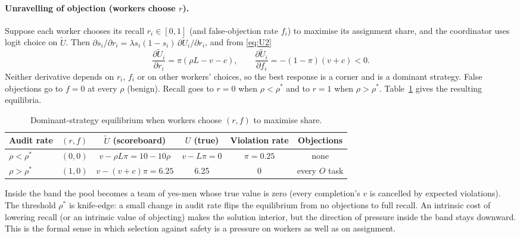 \documentclass[11pt,letterpaper]{article}
\newcommand{\rhostar}{\rho^{*}}
\newcommand{\Ut}{\tilde U}
\numberwithin{equation}{section}
\numberwithin{table}{section}
\numberwithin{figure}{section}
\numberwithin{algorithm}{section}
\begin{document}
\paragraph{Unravelling of objection (workers choose $r$).} Suppose each worker chooses its recall $r_i\in[0,1]$ (and false-objection rate $f_i$) to maximise its assignment share, and the coordinator uses logit choice on $\Ut$. Then $\partial s_i/\partial r_i=\lambda s_i(1-s_i)\,\partial\Ut_i/\partial r_i$, and from \eqref{eq:U2}
\begin{equation}\label{eq:br}
\frac{\partial\Ut_i}{\partial r_i}=\pi(\rho L-v-c),\qquad\frac{\partial\Ut_i}{\partial f_i}=-(1-\pi)(v+c)<0.
\end{equation}
Neither derivative depends on $r_i$, $f_i$ or on other workers' choices, so the best response is a corner and is a dominant strategy. False objections go to $f=0$ at every $\rho$ (benign). Recall goes to $r=0$ when $\rho<\rhostar$ and to $r=1$ when $\rho>\rhostar$. Table~\ref{tab:unravel} gives the resulting equilibria.

\begin{table}[h]
\centering\small
\caption{Dominant-strategy equilibrium when workers choose $(r,f)$ to maximise share.}
\label{tab:unravel}
\begin{adjustbox}{max width=\linewidth}
\begin{tabular}{lccccc}
\toprule
Audit rate & $(r,f)$ & $\Ut$ (scoreboard) & $U$ (true) & Violation rate & Objections \\
\midrule
$\rho<\rhostar$ & $(0,0)$ & $v-\rho L\pi=10-10\rho$ & $v-L\pi=0$ & $\pi=0.25$ & none \\
$\rho>\rhostar$ & $(1,0)$ & $v-(v+c)\pi=6.25$ & 6.25 & 0 & every $O$ task \\
\bottomrule
\end{tabular}
\end{adjustbox}
\end{table}

\noindent Inside the band the pool becomes a team of yes-men whose true value is zero (every completion's $v$ is cancelled by expected violations). The threshold $\rhostar$ is knife-edge: a small change in audit rate flips the equilibrium from no objections to full recall. An intrinsic cost of lowering recall (or an intrinsic value of objecting) makes the solution interior, but the direction of pressure inside the band stays downward. This is the formal sense in which selection against safety is a pressure on workers as well as on assignment.
\end{document}
